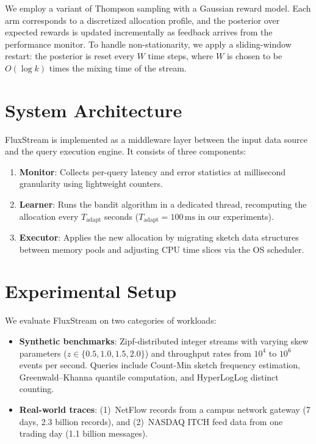 \documentclass[
    language=english,
    doctype=dissertation,
    institution=none,
    titlestyle=book,
]{../../omnilatex}
\begin{document}
We employ a variant of Thompson sampling with a Gaussian reward model. Each arm corresponds to a discretized allocation profile, and the posterior over expected rewards is updated incrementally as feedback arrives from the performance monitor. To handle non-stationarity, we apply a sliding-window restart: the posterior is reset every $W$ time steps, where $W$ is chosen to be $O(\log k)$ times the mixing time of the stream.

\section{System Architecture}

FluxStream is implemented as a middleware layer between the input data source and the query execution engine. It consists of three components:

\begin{enumerate}
    \item \textbf{Monitor}: Collects per-query latency and error statistics at millisecond granularity using lightweight counters.
    \item \textbf{Learner}: Runs the bandit algorithm in a dedicated thread, recomputing the allocation every $T_{\text{adapt}}$ seconds ($T_{\text{adapt}} = 100\,\text{ms}$ in our experiments).
    \item \textbf{Executor}: Applies the new allocation by migrating sketch data structures between memory pools and adjusting CPU time slices via the OS scheduler.
\end{enumerate}

\section{Experimental Setup}

We evaluate FluxStream on two categories of workloads:

\begin{itemize}
    \item \textbf{Synthetic benchmarks}: Zipf-distributed integer streams with varying skew parameters ($z \in \{0.5, 1.0, 1.5, 2.0\}$) and throughput rates from $10^4$ to $10^6$ events per second. Queries include Count-Min sketch frequency estimation, Greenwald--Khanna quantile computation, and HyperLogLog distinct counting.
    \item \textbf{Real-world traces}: (1)~NetFlow records from a campus network gateway (7 days, 2.3 billion records), and (2)~NASDAQ ITCH feed data from one trading day (1.1 billion messages).
\end{itemize}
\end{document}
